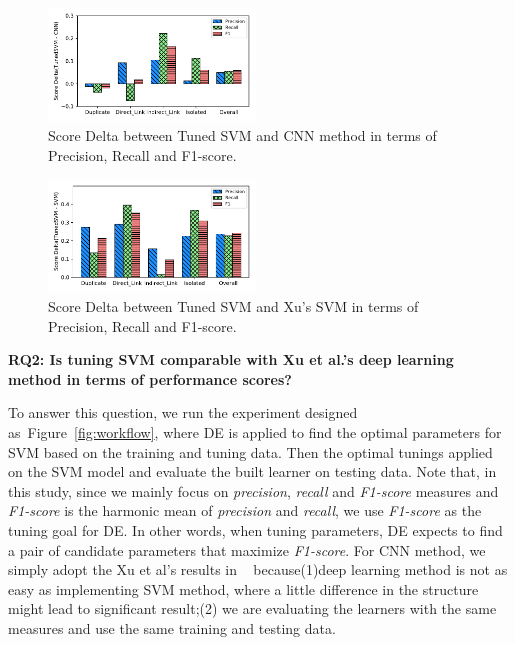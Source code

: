\documentclass[sigconf,review, anonymous]{acmart}
\theoremstyle{break}
\newcommand{\fig}[1]{Figure~\ref{fig:#1}}
\begin{document}
 \begin{figure}[!htp]
    \centering
    \includegraphics[width=0.49\textwidth]{pic/TunedSVM-CNN.pdf} %
    \caption{Score Delta between Tuned SVM and CNN method in terms of Precision, Recall and F1-score.}
    \label{fig:TunedSVM-CNN}
\end{figure}

 \begin{figure}[!htp]
    \centering
     \includegraphics[width=0.49\textwidth]{pic/TunedSVM-SVM.pdf} %
    \caption{Score Delta between Tuned SVM and Xu's SVM in terms of Precision, Recall and F1-score.}
    \label{fig:TunedSVM-SVM}
\end{figure}
\textbf{RQ2: Is tuning SVM comparable with Xu et al.'s deep learning method in terms of performance scores?}

To answer this question, we run the experiment designed as~\fig{workflow}, where DE is applied to 
find the optimal parameters for SVM based on the training and tuning data. Then the optimal tunings
applied on the SVM model and evaluate the built learner on testing data. Note that, in this study,
since we mainly focus on {\it precision}, {\it recall} and {\it F1-score} measures and {\it F1-score} is the
harmonic mean of {\it precision} and {\it recall}, we use {\it F1-score} as the tuning goal for DE.
In other words, when tuning parameters,  DE expects to find a pair of candidate parameters that maximize
{\it F1-score}. For CNN method, we simply adopt the Xu et al's results in ~\cite{xu2016predicting} because(1)deep learning method is not as easy as implementing SVM method, where a little difference in the structure might lead to significant result;(2) we are evaluating the learners with the same measures and use
the same training and testing data.
\end{document}
